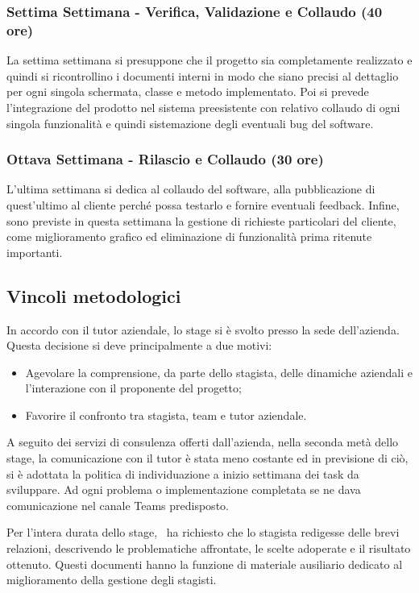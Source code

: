 \subsubsection*{Settima Settimana - Verifica, Validazione e Collaudo (40 ore)}
La settima settimana si presuppone che il progetto sia completamente realizzato e quindi si ricontrollino i documenti interni in modo che siano precisi al dettaglio per ogni singola schermata, classe e metodo implementato.
Poi si prevede l'integrazione del prodotto nel sistema preesistente con relativo collaudo di ogni singola funzionalità e quindi sistemazione degli eventuali bug del software.


\subsubsection*{Ottava Settimana - Rilascio e Collaudo (30 ore)}
L'ultima settimana si dedica al collaudo del software, alla pubblicazione di quest'ultimo al cliente perché possa testarlo e fornire eventuali feedback. Infine, sono previste in questa settimana la gestione di richieste particolari del cliente, come miglioramento grafico ed eliminazione di funzionalità prima ritenute importanti.


\subsection{Vincoli metodologici}
In accordo con il tutor aziendale, lo stage si è svolto presso la sede dell'azienda. Questa decisione si deve principalmente a due motivi: 
\begin{itemize}
	\item Agevolare la comprensione, da parte dello stagista, delle dinamiche aziendali e l’interazione con il proponente del progetto; 
	\item Favorire il confronto tra stagista, team e tutor aziendale.
\end{itemize}
A seguito dei servizi di consulenza offerti dall'azienda, nella seconda metà dello stage, la comunicazione con il tutor è stata meno costante ed in previsione di ciò, si è adottata la politica di individuazione a inizio settimana dei task da sviluppare. Ad ogni problema o implementazione completata se ne dava comunicazione nel canale Teams predisposto.

Per l'intera durata dello stage, \azienda\ ha richiesto che lo stagista redigesse delle brevi relazioni, descrivendo le problematiche affrontate, le scelte adoperate e il risultato ottenuto. Questi documenti hanno la funzione di materiale ausiliario dedicato al miglioramento della gestione degli stagisti.

